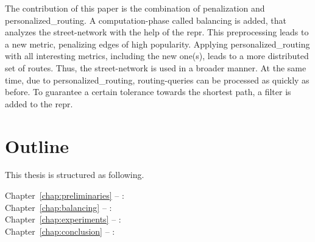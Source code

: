     The contribution of this paper is the combination of penalization and \gls{personalized_routing}.
    A computation-phase called \gls{balancing} is added, that analyzes the street-network with the help of the \gls{repr}.
    This preprocessing leads to a new \gls{metric}, penalizing edges of high popularity.
    Applying \gls{personalized_routing} with all interesting \glspl{metric}, including the new one(s), leads to a more distributed set of routes.
    Thus, the street-network is used in a broader manner.
    At the same time, due to \gls{personalized_routing}, routing-queries can be processed as quickly as before.
    To guarantee a certain tolerance towards the shortest path, a filter is added to the \gls{repr}.

\section{Outline}

    This thesis is structured as following.
    \begin{description}
        \item[Chapter~\ref{chap:preliminaries} -- :]
        \item[Chapter~\ref{chap:balancing} -- :]
        \item[Chapter~\ref{chap:experiments} -- :]
        \item[Chapter~\ref{chap:conclusion} -- :]
    \end{description}
